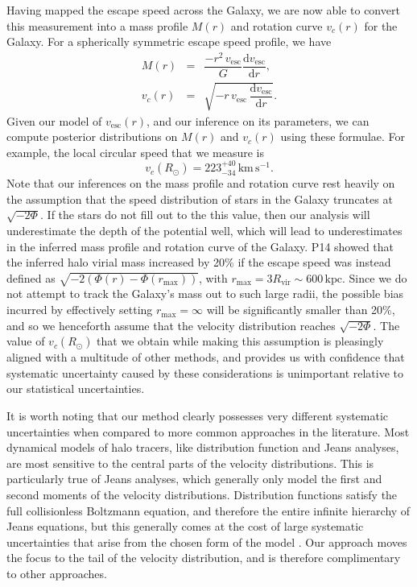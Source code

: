 \documentclass[useAMS,twocolumn,usenatbib]{mn2e}
\def\kpc{{\,\mathrm{kpc}}}
\def\kms{{\,\mathrm{km\,s^{-1}}}}
\def\vesc{{v_\mathrm{esc}}}
\begin{document}
Having mapped the escape speed across the Galaxy, we are now able to convert this measurement into a mass profile $M(r)$ and rotation curve $v_c(r)$ for the Galaxy. 
For a spherically symmetric escape speed profile, we have
%
\begin{eqnarray}
M(r) &=& \dfrac{-r^2\,\vesc}{G}\dfrac{\mathrm{d}\vesc}{\mathrm{d}r}, \label{eq:mass}\\
v_c(r) &=& \sqrt{-r\,\vesc\,\dfrac{\mathrm{d}\vesc}{\mathrm{d}r}}. \label{eq:circspeed}
\end{eqnarray}
%
Given our model of $\vesc(r)$, and our inference on its parameters, we can compute posterior distributions on $M(r)$ and $v_c(r)$ using these formulae.
For example, the local circular speed that we measure is
%
\begin{equation}
v_c(R_\odot) = 223^{+40}_{-34}\kms.
\end{equation}
%
Note that our inferences on the mass profile and rotation curve rest heavily on the assumption that the speed distribution of stars in the Galaxy truncates at $\sqrt{-2\Phi}$.
If the stars do not fill out to the this value, then our analysis will underestimate the depth of the potential well, which will lead to underestimates in the inferred mass profile and rotation curve of the Galaxy.
P14 showed that the inferred halo virial mass increased by 20\% if the escape speed was instead defined as $\sqrt{-2\left(\Phi(r) - \Phi(r_\mathrm{max})\right)}$, with $r_\mathrm{max} = 3R_\mathrm{vir} \sim 600\kpc$.
Since we do not attempt to track the Galaxy's mass out to such large radii, the possible bias incurred by effectively setting $r_\mathrm{max} = \infty$ will be significantly smaller than 20\%, and so we henceforth assume that the velocity distribution reaches $\sqrt{-2\Phi}$.
The value of $v_c(R_\odot)$ that we obtain while making this assumption is pleasingly aligned with a multitude of other methods, and provides us with confidence that systematic uncertainty caused by these considerations is unimportant relative to our statistical uncertainties.

It is worth noting that our method clearly possesses very different systematic uncertainties when compared to more common approaches in the literature.
Most dynamical models of halo tracers, like distribution function and Jeans analyses, are most sensitive to the central parts of the velocity distributions.
This is particularly true of Jeans analyses, which generally only model the first and second moments of the velocity distributions. 
Distribution functions satisfy the full collisionless Boltzmann equation, and therefore the entire infinite hierarchy of Jeans equations, but this generally comes at the cost of large systematic uncertainties that arise from the chosen form of the model \citep{Wa15}.  
Our approach moves the focus to the tail of the velocity distribution, and is therefore complimentary to other approaches.
\end{document}
